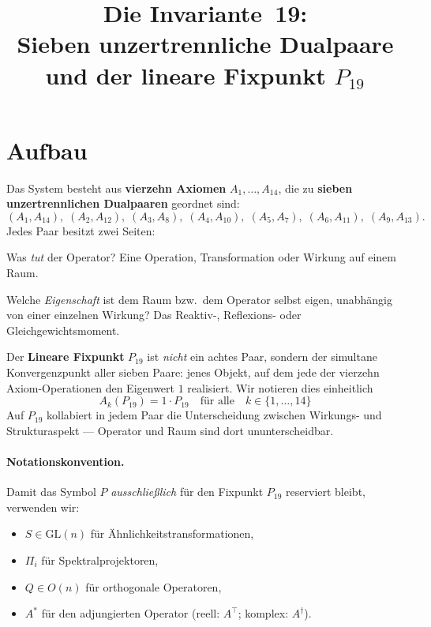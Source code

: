 \documentclass[11pt,a4paper]{article}
\title{Die Invariante~19:\\[0.3em]
  Sieben unzertrennliche Dualpaare\\
  und der lineare Fixpunkt $P_{19}$}
\author{}
\date{}
\newcommand{\T}{^{\!\top}}
\newcommand{\adj}{^{\ast}}
\begin{document}
\maketitle

\section*{Aufbau}

Das System besteht aus \textbf{vierzehn Axiomen} $A_1,\dots,A_{14}$,
die zu \textbf{sieben unzertrennlichen Dualpaaren} geordnet sind:
\[
  (A_1,A_{14}),\;(A_2,A_{12}),\;(A_3,A_8),\;(A_4,A_{10}),\;
  (A_5,A_7),\;(A_6,A_{11}),\;(A_9,A_{13}).
\]
Jedes Paar besitzt zwei Seiten:

\begin{description}[leftmargin=2em,style=nextline]
  \item[Wirkungsaspekt (Operator).] Was \emph{tut} der Operator? Eine
    Operation, Transformation oder Wirkung auf einem Raum.
  \item[Strukturaspekt (Raum).] Welche \emph{Eigenschaft} ist dem Raum
    bzw.\ dem Operator selbst eigen, unabhängig von einer einzelnen
    Wirkung? Das Reaktiv-, Reflexions- oder Gleichgewichtsmoment.
\end{description}

Der \textbf{Lineare Fixpunkt} $P_{19}$ ist \emph{nicht} ein achtes Paar,
sondern der simultane Konvergenzpunkt aller sieben Paare: jenes Objekt,
auf dem jede der vierzehn Axiom-Operationen den Eigenwert $1$ realisiert.
Wir notieren dies einheitlich
\[
  \boxed{\;A_k(P_{19}) = 1\cdot P_{19}\quad\text{für alle}\quad
    k\in\{1,\dots,14\}\;}
\]
Auf $P_{19}$ kollabiert in jedem Paar die Unterscheidung zwischen
Wirkungs- und Strukturaspekt --- Operator und Raum sind dort
ununterscheidbar.

\paragraph{Notationskonvention.}
Damit das Symbol $P$ \emph{ausschließlich} für den Fixpunkt $P_{19}$
reserviert bleibt, verwenden wir:
\begin{itemize}[leftmargin=2em]
  \item $S\in\mathrm{GL}(n)$ für Ähnlichkeitstransformationen,
  \item $\Pi_i$ für Spektralprojektoren,
  \item $Q\in O(n)$ für orthogonale Operatoren,
  \item $A\adj$ für den adjungierten Operator (reell: $A\T$;
        komplex: $A^{\dagger}$).
\end{itemize}
\end{document}
